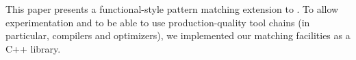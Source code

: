 This paper presents a functional-style pattern matching extension to \Cpp{}.
To allow experimentation and to be able to use production-quality tool chains (in particular, compilers and optimizers), we  implemented our matching facilities as a C++ library.



